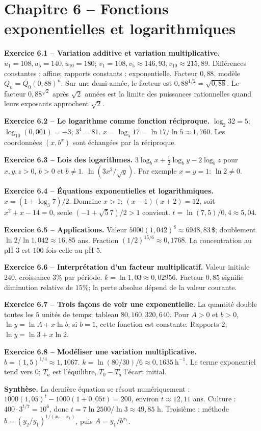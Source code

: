 \chapter*{Chapitre 6 -- Fonctions exponentielles et logarithmiques}
\begin{answerbox}
\textbf{Exercice 6.1 -- Variation additive et variation multiplicative.} $u_1=108,u_5=140,u_{10}=180$; $v_1=108,v_5\approx146{,}93,v_{10}\approx215{,}89$. Différences constantes : affine; rapports constants : exponentielle. Facteur $0{,}88$, modèle $Q_n=Q_0(0{,}88)^n$. Sur une demi-année, le facteur est $0{,}88^{1/2}=\sqrt{0{,}88}$. Le facteur $0{,}88^{\sqrt2}$ après $\sqrt2$ années est la limite des puissances rationnelles quand leurs exposants approchent $\sqrt2$.\par
\textbf{Exercice 6.2 -- Le logarithme comme fonction réciproque.} $\log_2 32=5$; $\log_{10}(0{,}001)=-3$; $3^4=81$. $x=\log_5 17=\ln17/\ln5\approx1{,}760$. Les coordonnées $(x,b^x)$ sont échangées par la réciproque.\par
\textbf{Exercice 6.3 -- Lois des logarithmes.} $3\log_bx+\frac12\log_by-2\log_bz$ pour $x,y,z>0$, $b>0$ et $b\ne1$. $\ln(3x^2/\sqrt y)$. Par exemple $x=y=1$: $\ln2\neq0$.\par
\textbf{Exercice 6.4 -- Équations exponentielles et logarithmiques.} $x=(1+\log_3 7)/2$. Domaine $x>1$; $(x-1)(x+2)=12$, soit $x^2+x-14=0$, seule $(-1+\sqrt57)/2>1$ convient. $t=\ln(7{,}5)/0{,}4\approx5{,}04$.\par
\textbf{Exercice 6.5 -- Applications.} Valeur $5000(1{,}042)^8\approx6948{,}83\,$\$; doublement $\ln2/\ln1{,}042\approx16{,}85$ ans. Fraction $(1/2)^{15/6}\approx0{,}1768$. La concentration au pH $3$ est $100$ fois celle au pH $5$.\par
\textbf{Exercice 6.6 -- Interprétation d'un facteur multiplicatif.} Valeur initiale $240$, croissance $3\%$ par période. $k=\ln1{,}03\approx0{,}02956$. Facteur $0{,}85$ signifie diminution relative de $15\%$; la perte absolue dépend de la valeur courante.\par
\textbf{Exercice 6.7 -- Trois façons de voir une exponentielle.} La quantité double toutes les $5$ unités de temps; tableau $80,160,320,640$. Pour $A>0$ et $b>0$, $\ln y=\ln A+x\ln b$; si $b=1$, cette fonction est constante. Rapports $2$; $\ln y=\ln3+x\ln2$.\par
\textbf{Exercice 6.8 -- Modéliser une variation multiplicative.} $b=(1{,}5)^{1/4}\approx1{,}1067$. $k=\ln(80/30)/6\approx0{,}1635\ \mathrm h^{-1}$. Le terme exponentiel tend vers $0$; $T_a$ est l'équilibre, $T_0-T_a$ l'écart initial.\par
\medskip\textbf{Synthèse.} La dernière équation se résout numériquement : $1000(1{,}05)^t-1000(1+0{,}05t)=200$, environ $t\approx12{,}11$ ans. Culture : $400\cdot3^{t/7}=10^6$, donc $t=7\ln2500/\ln3\approx49{,}85$ h. Troisième : méthode $b=(y_2/y_1)^{1/(x_2-x_1)}$, puis $A=y_1/b^{x_1}$.
\end{answerbox}
